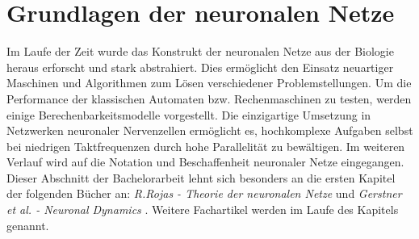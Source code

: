 %
\chapter{Grundlagen der neuronalen Netze}
\label{chap:neuro}
%
	Im Laufe der Zeit wurde das Konstrukt der neuronalen Netze aus der Biologie heraus erforscht und stark abstrahiert. Dies ermöglicht den Einsatz neuartiger Maschinen und Algorithmen zum Lösen verschiedener Problemstellungen. Um die Performance der klassischen Automaten bzw. Rechenmaschinen zu testen, werden einige Berechenbarkeitsmodelle vorgestellt. Die einzigartige Umsetzung in Netzwerken neuronaler Nervenzellen ermöglicht es, hochkomplexe Aufgaben selbst bei niedrigen Taktfrequenzen durch hohe Parallelität zu bewältigen. Im weiteren Verlauf wird auf die Notation und Beschaffenheit neuronaler Netze eingegangen.\\
	Dieser Abschnitt der Bachelorarbeit lehnt sich besonders an die ersten Kapitel der folgenden Bücher an: \textit{R.Rojas - Theorie der neuronalen Netze} \cite{TheorieNeuro} und \textit{Gerstner et al. - Neuronal Dynamics} \cite{NeuronalDynamics}. Weitere Fachartikel werden im Laufe des Kapitels genannt.
